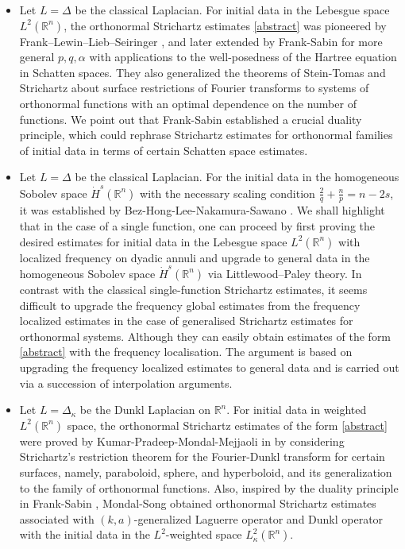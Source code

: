 \documentclass[a4paper,11pt, reqno]{amsart}
\numberwithin{equation}{section}
\theoremstyle{plain}
\theoremstyle{definition}
\theoremstyle{remark}
\begin{document}
\begin{itemize}
    \item Let $L=\Delta$ be the classical Laplacian. For initial data in the Lebesgue space $L^2(\mathbb{R}^n)$, the orthonormal Strichartz estimates \eqref{abstract} was pioneered by Frank–Lewin–Lieb–Seiringer \cite{FLLS}, and later extended by Frank-Sabin \cite{FS} for more general $p, q, \alpha$ with applications to the well-posedness of the Hartree equation in Schatten spaces.   They also  generalized the theorems of Stein-Tomas and Strichartz about surface restrictions of Fourier transforms to systems of orthonormal functions with an optimal dependence on the number of functions.
We point out that Frank-Sabin \cite{FS} established a crucial duality principle, which could rephrase Strichartz estimates for orthonormal families of initial data in terms of certain Schatten space
estimates.






     \item Let $L=\Delta$ be the classical Laplacian. For the initial data in the homogeneous Sobolev space $\dot{H}^s(\mathbb{R}^n)$ with the necessary scaling condition $\frac{2}{q}+\frac{n}{p}=n-2s$, it was established by Bez-Hong-Lee-Nakamura-Sawano \cite{Bez-Hong-Lee-Nakamura-Sawano}. We shall highlight that in the case of a single function, one can proceed by first proving the desired estimates for initial data in the Lebesgue space $L^2(\mathbb{R}^n)$
with localized frequency on dyadic annuli and upgrade to general data in the homogeneous Sobolev space $\dot{H}^s(\mathbb{R}^n)$ via Littlewood–Paley
theory. In contrast with the classical single-function Strichartz estimates, it seems difficult to upgrade the frequency global estimates from the frequency localized estimates in the case of generalised Strichartz estimates for orthonormal systems. Although they can easily obtain estimates of the form \eqref{abstract} with the frequency
localisation. The argument is based
on upgrading the frequency localized estimates to general data and is carried out via a
succession of interpolation arguments.

\item Let $L=\Delta_\kappa$ be the Dunkl Laplacian on $\mathbb{R}^n$.    For initial data in weighted $L^2(\mathbb{R}^n)$ space, the orthonormal Strichartz estimates of the form \eqref{abstract} were proved by Kumar-Pradeep-Mondal-Mejjaoli in \cite{shyam}  by considering  Strichartz's restriction theorem for the Fourier-Dunkl transform for certain surfaces, namely, paraboloid, sphere, and hyperboloid, and its generalization to the family of orthonormal functions. Also,    inspired by the duality principle in Frank-Sabin \cite{FS}, Mondal-Song \cite{MS} obtained orthonormal Strichartz estimates associated with  $(k, a)$-generalized Laguerre operator and Dunkl operator with the initial data in the $L^2$-weighted space $L^2_\kappa(\mathbb{R}^n)$.


\end{itemize}
\end{document}
